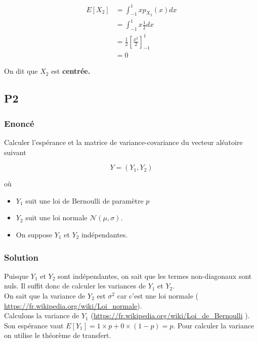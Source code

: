 \documentclass[
10pt, %
a4paper, %
oneside, %
headinclude,footinclude, %
BCOR5mm, %
]{scrartcl}
\begin{document}
\begin{equation}
    \begin{aligned}
        \label{eq:}
        E[X_2] &= \int^{1}_{-1} x p_{X_2}(x) dx \\
        &= \int^{1}_{-1} x \frac{1}{2}  dx \\
        &= \frac{1}{2}[ \frac{x^2}{2} ]^1_{-1}\\
        &= 0
    \end{aligned}
\end{equation}

On dit que $X_2$ est \textbf{{centrée.}} 

\subsection{\color{MidnightBlue}P2}

\subsubsection{Enoncé}
\label{par:enoncé}

Calculer l'espérance et la matrice de variance-covariance du vecteur aléatoire suivant

\begin{equation}
    Y = (Y_1, Y_2)
\end{equation}

où
\begin{itemize}
    \item $Y_1$ suit une loi de Bernoulli de paramètre $p$
    \item $Y_2$ suit une loi normale $ \mathcal{N}(\mu, \sigma)$.
    \item On suppose $Y_1$ et $Y_2$ indépendantes.
\end{itemize}

\subsubsection{Solution}

Puisque $Y_1$ et $Y_2$ sont indépendantes, on sait que les termes non-diagonaux
sont nuls. Il suffit donc de calculer les variances de $Y_1$ et $Y_2$.
\\

On sait que la variance de $Y_2$ est $\sigma^2$ car c'est une loi normale (
\url{https://fr.wikipedia.org/wiki/Loi_normale}).
\\

Calculons la variance de $Y_1$ (\url{https://fr.wikipedia.org/wiki/Loi_de_Bernoulli} ). Son espérance vaut $E[Y_1] = 1\times p+0\times (1-p) = p$.  Pour calculer la variance on utilise le théorème de transfert.
\end{document}
